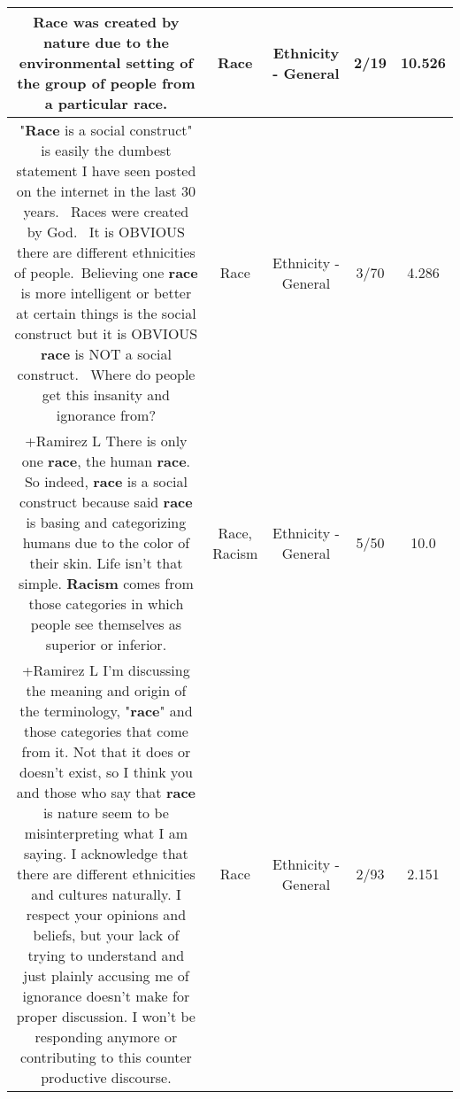 \documentclass[11pt]{article}
\newlength\mylength
\begin{document}
\begin{center}
\begin{longtable}{|C{.65\mylength}|C{.30\mylength}|C{.12\mylength}|C{.12\mylength}|C{.12\mylength}|}
  \small Race was created by nature due to the environmental setting of the group of people from a particular \textbf{race}.\normalsize   & Race & Ethnicity - General & 2/19 & 10.526 \\  \hline
  \small "\textbf{Race} is a social construct" is easily the dumbest statement I have seen posted on the internet in the last 30 years.  Races were created by God.  It is OBVIOUS there are different ethnicities of people. Believing one \textbf{race} is more intelligent or better at certain things is the social construct but it is OBVIOUS \textbf{race} is NOT a social construct.  Where do people get this insanity and ignorance from?\normalsize   & Race & Ethnicity - General & 3/70 & 4.286 \\  \hline
  \small +Ramirez L There is only one \textbf{race}, the human \textbf{race}. So indeed, \textbf{race} is a social construct because said \textbf{race} is basing and categorizing humans due to the color of their skin. Life isn't that simple. \textbf{Racism} comes from those categories in which people see themselves as superior or inferior.\normalsize   & Race, Racism & Ethnicity - General & 5/50 & 10.0 \\  \hline
  \small +Ramirez L I'm discussing the meaning and origin of the terminology, "\textbf{race}" and those categories that come from it. Not that it does or doesn't exist, so I think you and those who say that \textbf{race} is nature seem to be misinterpreting what I am saying. I acknowledge that there are different ethnicities and cultures naturally. I respect your opinions and beliefs, but your lack of trying to understand and just plainly accusing me of ignorance doesn't make for proper discussion. I won't be responding anymore or contributing to this counter productive discourse.\normalsize   & Race & Ethnicity - General & 2/93 & 2.151 \\  \hline

\end{longtable}
\end{center}
\end{document}

